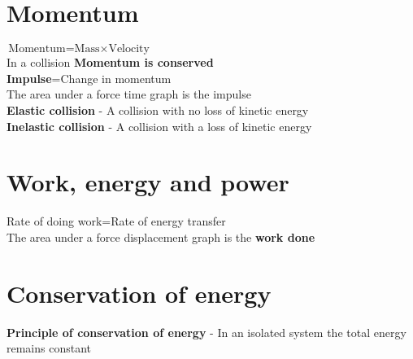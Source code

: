 \documentclass{article}[18pt]
\begin{document}
\section{Momentum}
$\text{Momentum=Mass}\times\text{Velocity}$\\
In a collision \textbf{Momentum is conserved}\\
\textbf{Impulse}=Change in momentum\\
The area under a force time graph is the impulse\\
\textbf{Elastic collision} - A collision with no loss of kinetic energy\\
\textbf{Inelastic collision} - A collision with a loss of kinetic energy
\section{Work, energy and power}
Rate of doing work=Rate of energy transfer\\
The area under a force displacement graph is the \textbf{work done}
\section{Conservation of energy}
\textbf{Principle of conservation of energy} - In an isolated system the total energy remains constant
\end{document}
